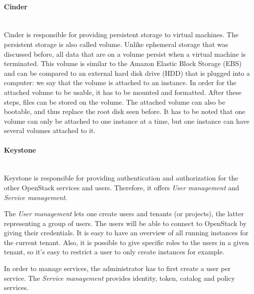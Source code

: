 \paragraph{Cinder}\mbox{}\\
Cinder is responsible for providing persistent storage to virtual machines. 
The persistent storage is also called volume. 
Unlike ephemeral storage that was discussed before, all data that are on a volume persist when a virtual machine is terminated. 
This volume is similar to the Amazon Elastic Block Storage (EBS) 
and can be compared to an external hard disk drive (HDD) that is plugged into a computer: we say that the volume is attached to an instance. 
In order for the attached volume to be usable, it has to be mounted and formatted. 
After these steps, files can be stored on the volume. 
The attached volume can also be bootable, and thus replace the root disk seen before.
It has to be noted that one volume can only be attached to one instance at a time, but one instance can have several volumes attached to it.


\paragraph{Keystone}\mbox{}\\
Keystone is responsible for providing authentication and authorization for the other OpenStack services and users. 
Therefore, it offers \textit{User management} and \textit{Service management}. 

The \textit{User management} lets one create users and tenants (or projects), the latter representing a group of users. 
The users will be able to connect to OpenStack by giving their credentials.
It is easy to have an overview of all running instances for the current tenant.
Also, it is possible to give specific roles to the users in a given tenant, so it's easy to restrict a user to only create instances for example. 

In order to manage services, the administrator has to first create a user per service. 
The \textit{Service management} provides identity, token, catalog and policy services.



